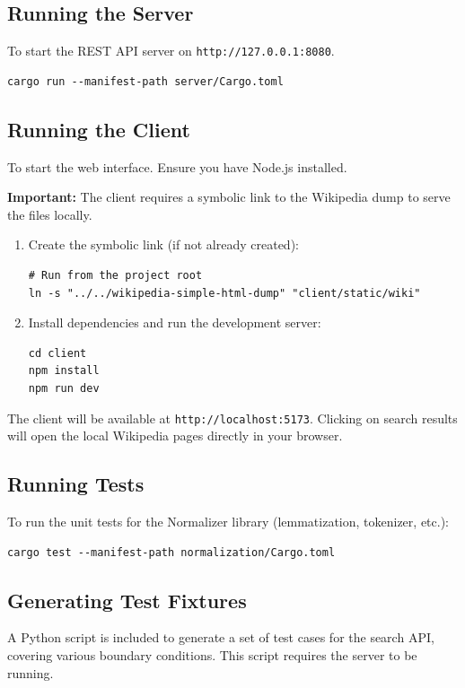 \documentclass[11pt, a4paper]{article}
\begin{document}
\subsection{Running the Server}
To start the REST API server on \texttt{http://127.0.0.1:8080}.

\begin{verbatim}
cargo run --manifest-path server/Cargo.toml
\end{verbatim}

\subsection{Running the Client}
To start the web interface. Ensure you have Node.js installed.

\textbf{Important:} The client requires a symbolic link to the Wikipedia dump to serve the files locally.

\begin{enumerate}
    \item Create the symbolic link (if not already created):
    \begin{verbatim}
# Run from the project root
ln -s "../../wikipedia-simple-html-dump" "client/static/wiki"
    \end{verbatim}
    
    \item Install dependencies and run the development server:
    \begin{verbatim}
cd client
npm install
npm run dev
    \end{verbatim}
\end{enumerate}

The client will be available at \texttt{http://localhost:5173}. Clicking on search results will open the local Wikipedia pages directly in your browser.

\subsection{Running Tests}
To run the unit tests for the Normalizer library (lemmatization, tokenizer, etc.):

\begin{verbatim}
cargo test --manifest-path normalization/Cargo.toml
\end{verbatim}

\subsection{Generating Test Fixtures}
A Python script is included to generate a set of test cases for the search API, covering various boundary conditions. This script requires the server to be running.
\end{document}
